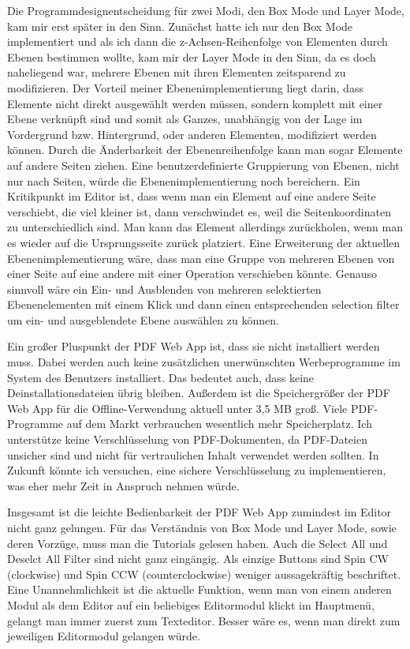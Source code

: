 \par
Die Programmdesignentscheidung für zwei Modi, den Box Mode und Layer Mode, kam mir erst später in den Sinn. Zunächst hatte ich nur den Box Mode implementiert und als ich dann die z-Achsen-Reihenfolge von Elementen durch Ebenen bestimmen wollte, kam mir der Layer Mode in den Sinn, da es doch naheliegend war, mehrere Ebenen mit ihren Elementen zeitsparend zu modifizieren. Der Vorteil meiner Ebenenimplementierung liegt darin, dass Elemente nicht direkt ausgewählt werden müssen, sondern komplett mit einer Ebene verknüpft sind und somit als Ganzes, unabhängig von der Lage im Vordergrund bzw. Hintergrund, oder anderen Elementen, modifiziert werden können. Durch die Änderbarkeit der Ebenenreihenfolge kann man sogar Elemente auf andere Seiten ziehen. Eine benutzerdefinierte Gruppierung von Ebenen, nicht nur nach Seiten, würde die Ebenenimplementierung noch bereichern. Ein Kritikpunkt im Editor ist, dass wenn man ein Element auf eine andere Seite verschiebt, die viel kleiner ist, dann verschwindet es, weil die Seitenkoordinaten zu unterschiedlich sind. Man kann das Element allerdings zurückholen, wenn man es wieder auf die Ursprungsseite zurück platziert. Eine Erweiterung der aktuellen Ebenenimplementierung wäre, dass man eine Gruppe von mehreren Ebenen von einer Seite auf eine andere mit einer Operation verschieben könnte. Genauso sinnvoll wäre ein Ein- und Ausblenden von mehreren selektierten Ebenenelementen mit einem Klick und dann einen entsprechenden selection filter um ein- und ausgeblendete Ebene auswählen zu können. 
\par   
Ein großer Pluspunkt der PDF Web App ist, dass sie nicht installiert werden muss. Dabei werden auch keine zusätzlichen unerwünschten Werbeprogramme im System des Benutzers installiert. Das bedeutet auch, dass keine Deinstallationsdateien übrig bleiben. Außerdem ist die Speichergrößer der PDF Web App für die Offline-Verwendung aktuell unter 3,5 MB groß. Viele PDF-Programme auf dem Markt verbrauchen wesentlich mehr Speicherplatz. Ich unterstütze keine Verschlüsselung von PDF-Dokumenten, da PDF-Dateien unsicher sind und nicht für vertraulichen Inhalt verwendet werden sollten. In Zukunft könnte ich versuchen, eine sichere Verschlüsselung zu implementieren, was eher mehr Zeit in Anspruch nehmen würde.
\par
Insgesamt ist die leichte Bedienbarkeit der PDF Web App zumindest im Editor nicht ganz gelungen. Für das Verständnis von Box Mode und Layer Mode, sowie deren Vorzüge, muss man die Tutorials gelesen haben. Auch die Select All und Deselct All Filter sind nicht ganz eingängig. Als einzige Buttons sind Spin CW (clockwise) und Spin CCW (counterclockwise) weniger aussagekräftig beschriftet. Eine Unannehmlichkeit ist die aktuelle Funktion, wenn man von einem anderen Modul als dem Editor auf ein beliebiges Editormodul klickt im Hauptmenü, gelangt man immer zuerst zum Texteditor. Besser wäre es, wenn man direkt zum jeweiligen Editormodul gelangen würde.

